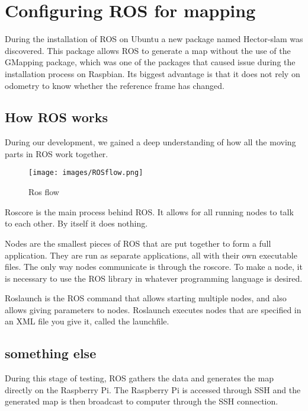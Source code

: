\clearpage
\section{Configuring ROS for mapping}

During the installation of ROS on Ubuntu a new package named Hector-slam was discovered.
This package allows ROS to generate a map without the use of the GMapping package, which was one of the packages that caused issue during the installation process on Raspbian. Its biggest advantage is that it does not rely on odometry to know whether the reference frame has changed.

\subsection{How ROS works}
During our development, we gained a deep understanding of how all the moving parts in ROS work together.

\begin{figure}[H]
	\centering
	\texttt{[image: images/ROSflow.png]}
	\caption{Ros flow}
\end{figure}

Roscore is the main process behind ROS. It allows for all running nodes to talk to each other. By itself it does nothing.

Nodes are the smallest pieces of ROS that are put together to form a full application. They are run as separate applications, all with their own executable files. The only way nodes communicate is through the roscore. To make a node, it is necessary to use the ROS library in whatever programming language is desired.

Roslaunch is the ROS command that allows starting multiple nodes, and also allows giving parameters to nodes. Roslaunch executes nodes that are specified in an XML file you give it, called the launchfile.


\subsection{something else}
During this stage of testing, ROS gathers the data and generates the map directly on the Raspberry Pi. The Raspberry Pi is accessed through SSH and the generated map is then broadcast to computer through the SSH connection.

